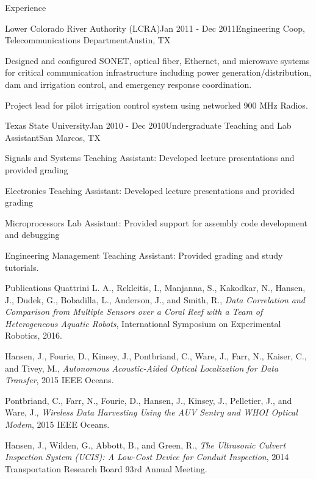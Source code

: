 \documentclass{resume} %
\begin{document}
\begin{rSection}{Experience}
\hfill \break

\begin{rSubsection}{Lower Colorado River Authority (LCRA)}{Jan 2011 - Dec 2011}{Engineering Coop, Telecommunications Department}{Austin, TX}
\item{Designed and configured SONET, optical fiber, Ethernet, and microwave systems for critical communication infrastructure including power generation/distribution, dam and 
            irrigation control, and emergency response coordination. }
\item{Project lead for pilot irrigation control system using networked 900 MHz Radios.}
\end{rSubsection}

\begin{rSubsection}{Texas State University}{Jan 2010 - Dec 2010}{Undergraduate Teaching and Lab Assistant}{San Marcos, TX}
\item{Signals and Systems Teaching Assistant: Developed lecture presentations and provided grading}
\item{Electronics Teaching Assistant: Developed lecture presentations and provided grading}
\item{Microprocessors Lab Assistant: Provided support for assembly code development and debugging}
\item{Engineering Management Teaching Assistant: Provided grading and study tutorials.}
\end{rSubsection}
\end{rSection}


\begin{rSection}{Publications}
Quattrini L. A., Rekleitis, I., Manjanna, S., Kakodkar, N., Hansen, J.,   Dudek, G.,  Bobadilla, L.,  Anderson, J., and Smith, R.,
            \textit{Data Correlation and Comparison from Multiple Sensors over a Coral Reef with a Team of Heterogeneous Aquatic Robots},
             International Symposium on Experimental Robotics,
              2016.
            
                
Hansen, J., Fourie, D., Kinsey, J., Pontbriand, C., Ware, J., Farr, N., Kaiser, C., and Tivey, M., \textit{Autonomous Acoustic-Aided Optical Localization for Data Transfer}, 2015 IEEE Oceans.

Pontbriand, C., Farr, N., Fourie, D., Hansen, J.,  Kinsey, J., Pelletier, J., and Ware, J., 
 \textit{Wireless Data Harvesting Using the AUV Sentry and WHOI Optical Modem}, 2015 IEEE Oceans.

Hansen, J., Wilden, G., Abbott, B., and Green, R., \textit{The Ultrasonic Culvert
Inspection System (UCIS): A Low-Cost Device for Conduit Inspection}, 2014 Transportation
Research Board 93rd Annual Meeting. 
\end{rSection}
\end{document}
